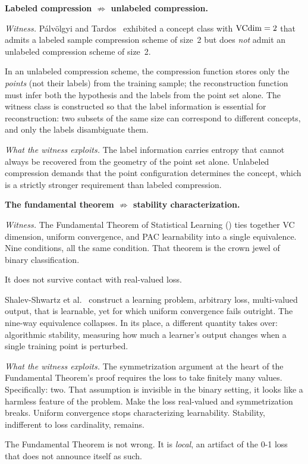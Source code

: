 
\begin{separation}
\textbf{Labeled compression $\not\Rightarrow$ unlabeled compression.}

\medskip\noindent
\emph{Witness.}
P\'alv\"olgyi and Tardos~\cite{PalvolgyiTardos2020} exhibited a
concept class with $\mathrm{VCdim} = 2$ that admits a labeled sample compression
scheme of size~2 but does \emph{not} admit an unlabeled compression
scheme of size~2.

In an unlabeled compression scheme, the compression function stores only
the \emph{points} (not their labels) from the training sample; the
reconstruction function must infer both the hypothesis and the labels
from the point set alone. The witness class is constructed so that the
label information is essential for reconstruction: two subsets of the
same size can correspond to different concepts, and only the labels
disambiguate them.

\medskip\noindent
\emph{What the witness exploits.}
The label information carries entropy that cannot always be recovered
from the geometry of the point set alone. Unlabeled compression demands
that the point configuration determines the concept, which is a strictly
stronger requirement than labeled compression.

\hfill\cite{PalvolgyiTardos2020}
\end{separation}


\begin{separation}
\textbf{The fundamental theorem $\not\Rightarrow$ stability
characterization.}

\medskip\noindent
\emph{Witness.}
The Fundamental Theorem of Statistical Learning () ties
together VC dimension, uniform convergence, and PAC learnability into a
single equivalence.  Nine conditions, all the same condition.  That
theorem is the crown jewel of binary classification.

It does not survive contact with real-valued loss.

Shalev-Shwartz et al.~\cite{ShalevShwartzShamir2010} construct a
learning problem, arbitrary loss, multi-valued output, that is
learnable, yet for which uniform convergence fails outright.  The
nine-way equivalence collapses.  In its place, a different quantity
takes over: algorithmic stability, measuring how much a learner's output
changes when a single training point is perturbed.

\medskip\noindent
\emph{What the witness exploits.}
The symmetrization argument at the heart of the Fundamental Theorem's
proof requires the loss to take finitely many values.  Specifically:
two.  That assumption is invisible in the binary setting, it looks like
a harmless feature of the problem.  Make the loss real-valued and
symmetrization breaks.  Uniform convergence stops characterizing
learnability.  Stability, indifferent to loss cardinality, remains.

The Fundamental Theorem is not wrong.  It is \emph{local}, an artifact
of the 0-1 loss that does not announce itself as such.

\hfill\cite{ShalevShwartzShamir2010}
\end{separation}



